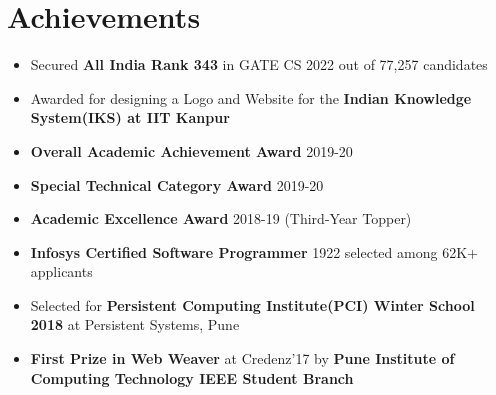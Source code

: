 \documentclass[10.8pt, a4paper]{extarticle}
\newcommand{\shorterSection}[1]{\vspace{-10pt}\section{#1}}
\begin{document}
\shorterSection{Achievements}
\begin{itemize}
  \item Secured \textbf{All India Rank 343} in GATE CS 2022 out of 77,257 candidates\\[-0.6cm]
  \item Awarded for designing a Logo and Website for the \textbf{Indian Knowledge System(IKS) at IIT Kanpur}\\[-0.6cm]
  \item \textbf{Overall Academic Achievement Award} 2019-20\\[-0.6cm]
  \item \textbf{Special Technical Category Award} 2019-20\\[-0.6cm]
  \item \textbf{Academic Excellence Award} 2018-19 (Third-Year Topper)\\[-0.6cm]
  \item \textbf{Infosys Certified Software Programmer} 1922 selected among 62K+ applicants\\[-0.6cm]
  \item Selected for \textbf{Persistent Computing Institute(PCI) Winter School 2018} at Persistent Systems, Pune\\[-0.6cm]
  \item \textbf{First Prize in Web Weaver} at Credenz'17 by \textbf{Pune Institute of Computing Technology IEEE Student Branch}\\[-0.6cm]
\end{itemize}
\end{document}
